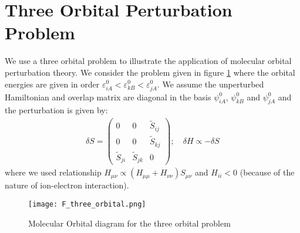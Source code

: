 \documentclass{article}
\begin{document}
\section{Three Orbital Perturbation Problem}
We use a three orbital problem to illustrate the application of molecular orbital 
perturbation theory. We consider the problem given in figure \ref{F:three_orbital}
where the orbital energies are given in order 
$\varepsilon_{iA}^0 < \varepsilon_{kB}^0 <\varepsilon_{jA}^0$. We assume the unperturbed 
Hamiltonian and overlap matrix are diagonal in the basis $\psi_{iA}^0$, $\psi_{kB}^0$ and $\psi_{jA}^0$
and the perturbation is given by:
\begin{align}
    \delta S = \left(\begin{matrix}
        0 & 0 & \tilde{S}_{ij} \\
        0 & 0 & \tilde{S}_{kj} \\
        \tilde{S}_{ji} & \tilde{S}_{jk} & 0 
    \end{matrix}\right) ; \quad \delta H \propto - \delta S
\end{align}
where we used relationship $H_{\mu\nu} \propto (H_{\mu\mu} + H_{\nu\nu}) S_{\mu\nu} $
and $H_{ii} < 0$ (because of the nature of ion-electron interaction). 

\begin{figure}[h!]
    \centering
    \texttt{[image: F\_three\_orbital.png]}
    \caption{Molecular Orbital diagram for the three orbital problem}
    \label{F:three_orbital}
\end{figure}
\end{document}
